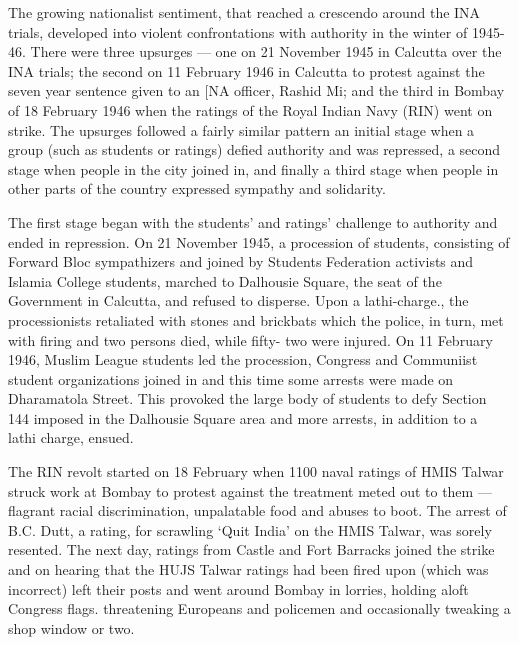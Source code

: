 The growing nationalist sentiment, that reached a crescendo around the INA trials, developed into violent confrontations with authority in the winter of 1945-46. There were three upsurges — one on 21 November 1945 in Calcutta over the INA trials; the second on 11 February 1946 in Calcutta to protest against the seven year sentence given to an [NA officer, Rashid Mi; and the third in Bombay of 18 February 1946 when the ratings of the Royal Indian Navy (RIN) went on strike. The upsurges followed a fairly similar pattern an initial stage when a group (such as students or ratings) defied authority and was repressed, a second stage when people in the city joined in, and finally a third stage when people in other parts of the country expressed sympathy and solidarity. 

The first stage began with the students’ and ratings’ challenge to authority and ended in repression. On 21 November 1945, a procession of students, consisting of Forward Bloc sympathizers and joined by Students Federation activists and Islamia College students, marched to Dalhousie Square, the seat of the Government in Calcutta, and refused to disperse. Upon a lathi-charge., the processionists retaliated with stones and brickbats which the police, in turn, met with firing and two persons died, while fifty- two were injured. On 11 February 1946, Muslim League students led the procession, Congress and Communiist student organizations joined in and this time some arrests were made on Dharamatola Street. This provoked the large body of students to defy Section 144 imposed in the Dalhousie Square area and more arrests, in addition to a lathi­ charge, ensued. 

The RIN revolt started on 18 February when 1100 naval ratings of HMIS Talwar struck work at Bombay to protest against the treatment meted out to them — flagrant racial discrimination, unpalatable food and abuses to boot. The arrest of B.C. Dutt, a rating, for scrawling ‘Quit India’ on the HMIS Talwar, was sorely resented. The next day, ratings from Castle and Fort Barracks joined the strike and on hearing that the HUJS Talwar ratings had been fired upon (which was incorrect) left their posts and went around Bombay in lorries, holding aloft Congress flags. threatening Europeans and policemen and occasionally tweaking a shop window or two. 

